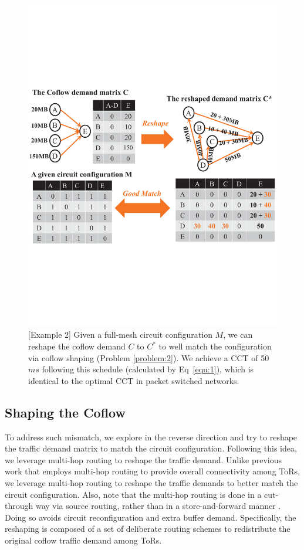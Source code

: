 \begin{figure}[t]
  \centering
  \includegraphics[scale=0.38]{figures/X22}%
  \caption{[Example 2] Given a full-mesh circuit configuration $M$, we can reshape the coflow demand $C$ to $C^*$ to well match the configuration via coflow shaping (Problem \ref{problem:2}). We achieve a CCT of 50$ms$ following this schedule (calculated by Eq~\eqref{equ:1}), which is identical to the optimal CCT in packet switched networks. }
  \label{fig:2}
\end{figure}


\subsection{Shaping the Coflow}
\label{sec:alg2}
To address such mismatch, we explore in the reverse direction and try to reshape the traffic demand matrix to match the circuit configuration.
Following this idea, we leverage multi-hop routing to reshape the traffic demand.
Unlike previous work \cite{osa} that employs multi-hop routing to provide overall connectivity among ToRs, we leverage multi-hop routing to reshape the traffic demands to better match the circuit configuration.
Also, note that the multi-hop routing is done in a cut-through way via source routing, rather than in a store-and-forward manner \cite{eclipse}. Doing so avoids circuit reconfiguration and extra buffer demand.
Specifically, the reshaping is composed of a set of deliberate routing schemes to redistribute the original coflow traffic demand among ToRs.

